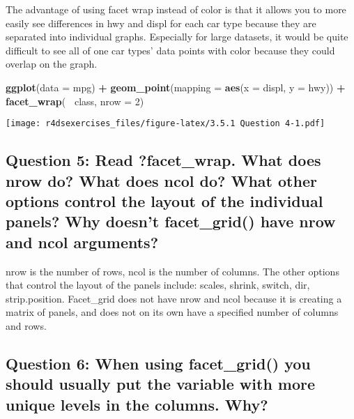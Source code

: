\documentclass[
]{book}
\newenvironment{Shaded}{\begin{snugshade}}{\end{snugshade}}
\newcommand{\DataTypeTok}[1]{\textcolor[rgb]{0.13,0.29,0.53}{#1}}
\newcommand{\DecValTok}[1]{\textcolor[rgb]{0.00,0.00,0.81}{#1}}
\newcommand{\KeywordTok}[1]{\textcolor[rgb]{0.13,0.29,0.53}{\textbf{#1}}}
\newcommand{\NormalTok}[1]{#1}
\newcommand{\OperatorTok}[1]{\textcolor[rgb]{0.81,0.36,0.00}{\textbf{#1}}}
\newcommand{\StringTok}[1]{\textcolor[rgb]{0.31,0.60,0.02}{#1}}
\begin{document}
The advantage of using facet wrap instead of color is that it allows you to more easily see differences in hwy and displ for each car type because they are separated into individual graphs. Especially for large datasets, it would be quite difficult to see all of one car types' data points with color because they could overlap on the graph.

\begin{Shaded}
\begin{Highlighting}[]
\KeywordTok{ggplot}\NormalTok{(}\DataTypeTok{data =}\NormalTok{ mpg) }\OperatorTok{+}\StringTok{ }
\StringTok{  }\KeywordTok{geom_point}\NormalTok{(}\DataTypeTok{mapping =} \KeywordTok{aes}\NormalTok{(}\DataTypeTok{x =}\NormalTok{ displ, }\DataTypeTok{y =}\NormalTok{ hwy)) }\OperatorTok{+}\StringTok{ }
\StringTok{  }\KeywordTok{facet_wrap}\NormalTok{(}\OperatorTok{~}\StringTok{ }\NormalTok{class, }\DataTypeTok{nrow =} \DecValTok{2}\NormalTok{)}
\end{Highlighting}
\end{Shaded}

\texttt{[image: r4dsexercises\_files/figure-latex/3.5.1 Question 4-1.pdf]}

\hypertarget{question-5-read-facet_wrap.-what-does-nrow-do-what-does-ncol-do-what-other-options-control-the-layout-of-the-individual-panels-why-doesnt-facet_grid-have-nrow-and-ncol-arguments}{%
\subsection{Question 5: Read ?facet\_wrap. What does nrow do? What does ncol do? What other options control the layout of the individual panels? Why doesn't facet\_grid() have nrow and ncol arguments?}\label{question-5-read-facet_wrap.-what-does-nrow-do-what-does-ncol-do-what-other-options-control-the-layout-of-the-individual-panels-why-doesnt-facet_grid-have-nrow-and-ncol-arguments}}

nrow is the number of rows, ncol is the number of columns. The other options that control the layout of the panels include: scales, shrink, switch, dir, strip.position. Facet\_grid does not have nrow and ncol because it is creating a matrix of panels, and does not on its own have a specified number of columns and rows.

\hypertarget{question-6-when-using-facet_grid-you-should-usually-put-the-variable-with-more-unique-levels-in-the-columns.-why}{%
\subsection{Question 6: When using facet\_grid() you should usually put the variable with more unique levels in the columns. Why?}\label{question-6-when-using-facet_grid-you-should-usually-put-the-variable-with-more-unique-levels-in-the-columns.-why}}
\end{document}
